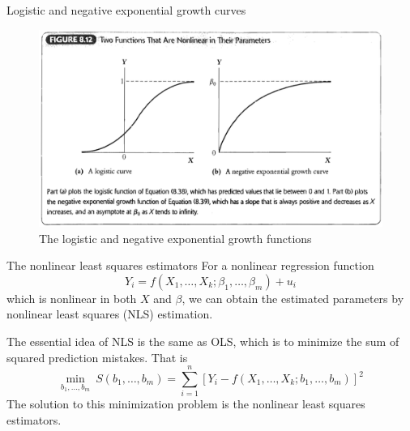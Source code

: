 \documentclass[presentation,10pt]{beamer}
\begin{document}
\begin{frame}[label={sec:org11c196f}]{Logistic and negative exponential growth curves}
\begin{figure}[htbp]
\centering
\includegraphics[width=.9\linewidth]{img/fig-8-12.png}
\caption{\label{fig:org89175f4}
The logistic and negative exponential growth functions}
\end{figure}
\end{frame}

\begin{frame}[label={sec:orgc5694de}]{The nonlinear least squares estimators}
For a nonlinear regression function
\[ Y_i = f(X_1, \ldots, X_k; \beta_1, \ldots, \beta_m) + u_i \]
which is nonlinear in both \(X\) and \(\beta\), we can obtain the
estimated parameters by \alert{nonlinear least squares} (NLS) estimation. 

\vspace{0.1cm}

The essential idea of NLS is the same as OLS, which is to minimize the sum
of squared prediction mistakes. That is
\begin{equation*}
\operatorname*{min}_{b_1, \ldots, b_m}\: S(b_1, \ldots, b_m) = \sum_{i=1}^n \left[ Y_i - f(X_1, \ldots, X_k; b_1, \ldots, b_m) \right]^2
\end{equation*}
The solution to this minimization problem is the nonlinear least
squares estimators.
\end{frame}
\end{document}
